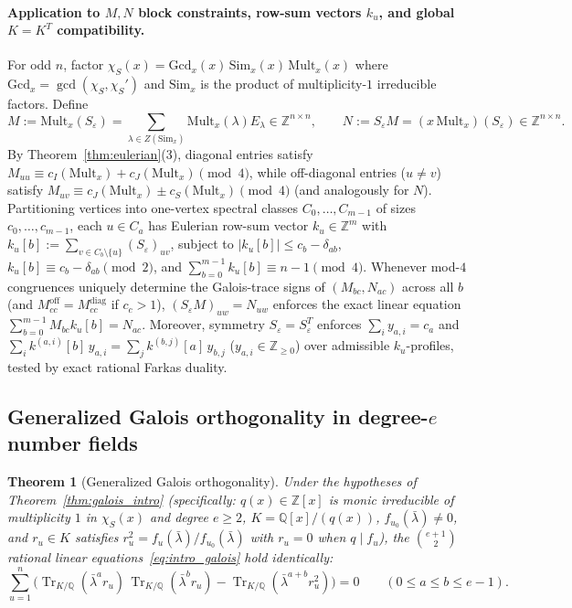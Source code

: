 \documentclass[11pt,reqno]{amsart}
\newtheorem{theorem}{Theorem}[section]
\theoremstyle{definition}
\theoremstyle{remark}
\numberwithin{equation}{section}
\numberwithin{table}{section}
\DeclareMathOperator{\Tr}{Tr}
\begin{document}
\paragraph{Application to $M, N$ block constraints, row-sum vectors $k_u$, and global $K = K^T$ compatibility.}
For odd $n$, factor $\chi_S(x) = \mathrm{Gcd}_x(x)\,\mathrm{Sim}_x(x)\,\mathrm{Mult}_x(x)$ where $\mathrm{Gcd}_x = \gcd(\chi_S, \chi_S')$ and $\mathrm{Sim}_x$ is the product of multiplicity-$1$ irreducible factors. Define
\[
  M := \mathrm{Mult}_x(S_\varepsilon) = \sum_{\lambda \in Z(\mathrm{Sim}_x)} \mathrm{Mult}_x(\lambda) E_\lambda \in \mathbb{Z}^{n \times n}, \qquad N := S_\varepsilon M = (x\,\mathrm{Mult}_x)(S_\varepsilon) \in \mathbb{Z}^{n \times n}.
\]
By Theorem~\ref{thm:eulerian}(3), diagonal entries satisfy $M_{uu} \equiv c_I(\mathrm{Mult}_x) + c_J(\mathrm{Mult}_x) \pmod 4$, while off-diagonal entries ($u \neq v$) satisfy $M_{uv} \equiv c_J(\mathrm{Mult}_x) \pm c_S(\mathrm{Mult}_x) \pmod 4$ (and analogously for $N$). Partitioning vertices into one-vertex spectral classes $C_0, \dots, C_{m-1}$ of sizes $c_0, \dots, c_{m-1}$, each $u \in C_a$ has Eulerian row-sum vector $k_u \in \mathbb{Z}^m$ with $k_u[b] := \sum_{v \in C_b \setminus \{u\}} (S_\varepsilon)_{uv}$, subject to $|k_u[b]| \le c_b - \delta_{ab}$, $k_u[b] \equiv c_b - \delta_{ab} \pmod 2$, and $\sum_{b=0}^{m-1} k_u[b] \equiv n - 1 \pmod 4$. Whenever mod-$4$ congruences uniquely determine the Galois-trace signs of $(M_{bc}, N_{ac})$ across all $b$ (and $M_{cc}^{\mathrm{off}} = M_{cc}^{\mathrm{diag}}$ if $c_c > 1$), $(S_\varepsilon M)_{uw} = N_{uw}$ enforces the exact linear equation $\sum_{b=0}^{m-1} M_{bc} k_u[b] = N_{ac}$. Moreover, symmetry $S_\varepsilon = S_\varepsilon^T$ enforces $\sum_i y_{a,i} = c_a$ and $\sum_i k^{(a,i)}[b]\,y_{a,i} = \sum_j k^{(b,j)}[a]\,y_{b,j}$ ($y_{a,i} \in \mathbb{Z}_{\ge 0}$) over admissible $k_u$-profiles, tested by exact rational Farkas duality.

\subsection{Generalized Galois orthogonality in \texorpdfstring{degree-$e$}{degree-e} number fields}
\begin{theorem}[Generalized Galois orthogonality]\label{thm:galois}
Under the hypotheses of Theorem~\ref{thm:galois_intro} (specifically: $q(x) \in \mathbb{Z}[x]$ is monic irreducible of multiplicity $1$ in $\chi_S(x)$ and degree $e \ge 2$, $K = \mathbb{Q}[x]/(q(x))$, $f_{u_0}(\bar{\lambda}) \neq 0$, and $r_u \in K$ satisfies $r_u^2 = f_u(\bar{\lambda})/f_{u_0}(\bar{\lambda})$ with $r_u = 0$ when $q \mid f_u$), the $\binom{e + 1}{2}$ rational linear equations~\eqref{eq:intro_galois} hold identically:
\[
  \sum_{u=1}^n \Big(\Tr_{K/\mathbb{Q}}(\bar{\lambda}^a r_u)\,\Tr_{K/\mathbb{Q}}(\bar{\lambda}^b r_u) - \Tr_{K/\mathbb{Q}}(\bar{\lambda}^{a+b} r_u^2)\Big) = 0 \qquad (0 \le a \le b \le e - 1).
\]
\end{theorem}
\end{document}
